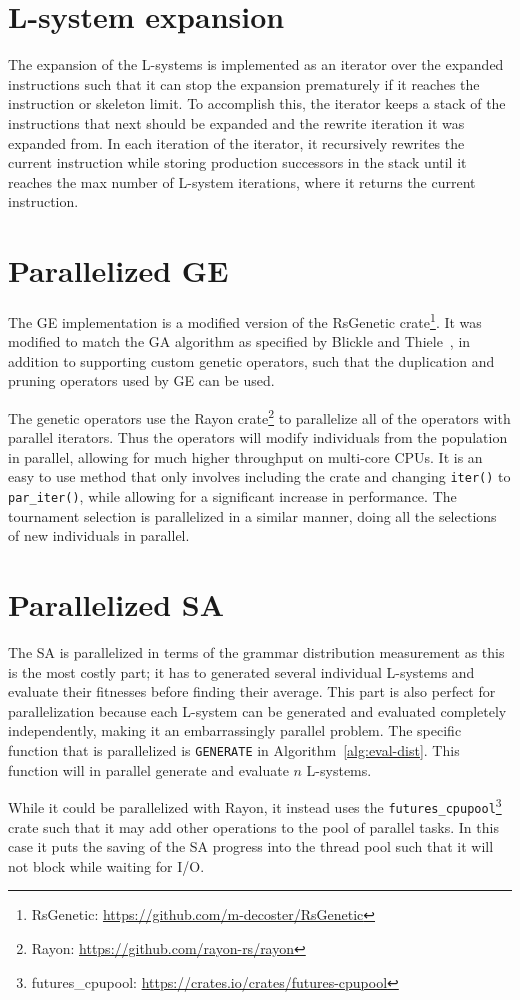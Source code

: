 \section{L-system expansion}
The expansion of the L-systems is implemented as an iterator over the expanded instructions such that it can stop the expansion prematurely if it reaches the instruction or skeleton limit.
To accomplish this, the iterator keeps a stack of the instructions that next should be expanded and the rewrite iteration it was expanded from.
In each iteration of the iterator, it recursively rewrites the current instruction while storing production successors in the stack until it reaches the max number of L-system iterations, where it returns the current instruction.

\section{Parallelized GE}
The GE implementation is a modified version of the RsGenetic crate\footnote{RsGenetic: \url{https://github.com/m-decoster/RsGenetic}}.
It was modified to match the GA algorithm as specified by Blickle and Thiele~\cite{1995Blickle}, in addition to supporting custom genetic operators, such that the duplication and pruning operators used by GE can be used.

The genetic operators use the Rayon crate\footnote{Rayon: \url{https://github.com/rayon-rs/rayon}} to parallelize all of the operators with parallel iterators.
Thus the operators will modify individuals from the population in parallel, allowing for much higher throughput on multi-core CPUs.
It is an easy to use method that only involves including the crate and changing \texttt{iter()} to \texttt{par\_iter()}, while allowing for a significant increase in performance.
The tournament selection is parallelized in a similar manner, doing all the selections of new individuals in parallel.

\section{Parallelized SA}
The SA is parallelized in terms of the grammar distribution measurement as this is the most costly part; it has to generated several individual L-systems and evaluate their fitnesses before finding their average.
This part is also perfect for parallelization because each L-system can be generated and evaluated completely independently, making it an embarrassingly parallel problem.
The specific function that is parallelized is \texttt{GENERATE} in Algorithm~\ref{alg:eval-dist}.
This function will in parallel generate and evaluate $n$ L-systems.

While it could be parallelized with Rayon, it instead uses the \texttt{futures\_cpupool}\footnote{futures\_cpupool: \url{https://crates.io/crates/futures-cpupool}} crate such that it may add other operations to the pool of parallel tasks.
In this case it puts the saving of the SA progress into the thread pool such that it will not block while waiting for I/O.
